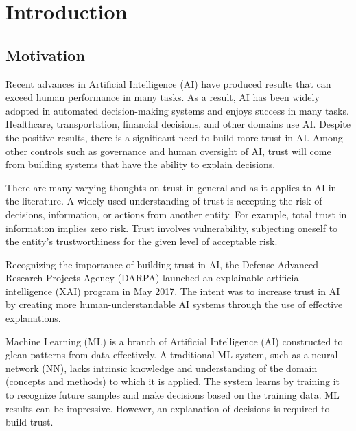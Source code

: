 \chapter{Introduction}\label{ch:intro}

\section{Motivation}

Recent advances in Artificial Intelligence (AI) have produced results that can
exceed human performance in many tasks. As a result, AI has been widely adopted
in automated decision-making systems and enjoys success in many tasks.
Healthcare, transportation, financial decisions, and other domains use AI.
Despite the positive results, there is a significant need to build more trust in
AI. Among other controls such as governance and human oversight of AI, trust
will come from building systems that have the ability to explain decisions. 

There are many varying thoughts on trust in general and as it applies to AI in
the literature. A widely used understanding of trust is accepting the risk of
decisions, information, or actions from another entity. For example, total trust
in information implies zero risk. Trust involves vulnerability, subjecting
oneself to the entity's trustworthiness for the given level of acceptable
risk\cite{gambetta2000can, mayer1995integrative,
lockey2021review, glikson2020human}.

Recognizing the importance of building trust in AI, the Defense Advanced
Research Projects Agency (DARPA) launched an explainable artificial intelligence
(XAI) program in May 2017. The intent was to increase trust in AI by creating
more human-understandable AI systems through the use of effective
explanations\cite{dw2019darpa}.


Machine Learning (ML) is a branch of Artificial Intelligence (AI) constructed to
glean patterns from data effectively. A traditional ML system, such as a neural
network (NN), lacks intrinsic knowledge and understanding of the domain
(concepts and methods) to which it is applied. The system learns by training it
to recognize future samples and make decisions based on the training data. ML
results can be impressive. However, an explanation of decisions is required to
build trust\cite{dw2019darpa}.

